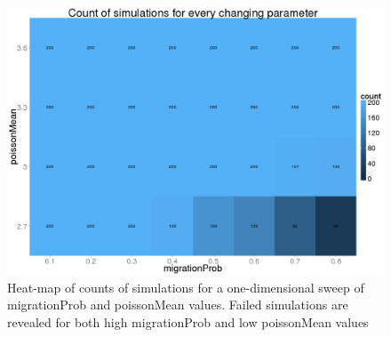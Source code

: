 \documentclass[a4paper,12pt]{report}
\begin{document}
\begin{figure}[!htbp]
	\centering
	\includegraphics[scale=0.3]{../data/count-2d.png}
	\caption{Heat-map of counts of simulations for a one-dimensional sweep of migrationProb and poissonMean values. Failed simulations are revealed for both high migrationProb and low poissonMean values}
	\label{app:count-2d}
\end{figure}
\end{document}
